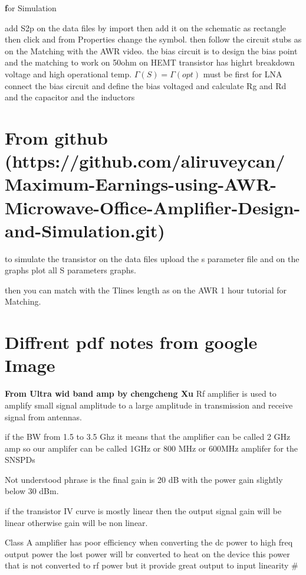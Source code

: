 \documentclass{article}
\begin{document}
 \textbf for Simulation 

 add S2p on the data files by import then add it on the schematic as rectangle then click and from Properties change the symbol.
 then follow the circuit stubs as on the Matching with the AWR video.
 the bias circuit is to design the bias point and the matching to work on  50ohm 
 on HEMT  transistor has highrt breakdown voltage and high operational temp.
$
\Gamma (S) = \Gamma (opt) $  must be first for LNA
connect the bias circuit and define the bias voltaged and calculate Rg and Rd and the capacitor and the inductors






\section{From github (https://github.com/aliruveycan/Maximum-Earnings-using-AWR-Microwave-Office-Amplifier-Design-and-Simulation.git)}

to simulate the  transistor on the data files upload the s parameter file 
and on the graphs plot all S parameters graphs.

then you can match with the Tlines  length as on the AWR 1 hour tutorial for Matching.








\section{Diffrent pdf notes from google Image}
\textbf{From Ultra wid band amp by chengcheng Xu}
Rf amplifier is used to amplify small signal amplitude to a large amplitude  in transmission and receive signal from antennas.


if the BW from 1.5 to 3.5  Ghz it means that  the amplifier can  be called 2 GHz amp so our amplifer can be called 
1GHz  or 800 MHz  or 600MHz   amplifer for the SNSPDs 


 Not understood   phrase is the final gain is 20 dB with the power gain slightly below 30 dBm.

 if the transistor IV curve is mostly linear then the output signal gain will be linear otherwise gain will be non linear.

 Class A amplifier has poor efficiency when converting the dc power to high freq output power 
 the lost power will br converted to heat on the device this power that is not converted to rf power 
but it provide great output to input linearity 
#
\end{document}
